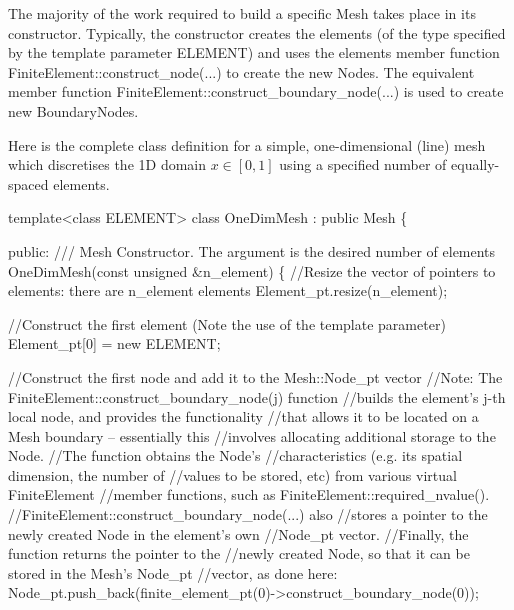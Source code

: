 The majority of the work required to build a specific {\ttfamily Mesh} takes place in its constructor. Typically, the constructor creates the elements (of the type specified by the template parameter {\ttfamily E\+L\+E\+M\+E\+NT}) and uses the elements\textquotesingle{} member function {\ttfamily Finite\+Element\+::construct\+\_\+node}(...) to create the new {\ttfamily Nodes}. The equivalent member function {\ttfamily Finite\+Element\+::construct\+\_\+boundary\+\_\+node}(...) is used to create new {\ttfamily Boundary\+Nodes}.

Here is the complete class definition for a simple, one-\/dimensional (line) mesh which discretises the 1D domain $x\in [0,1]$ using a specified number of equally-\/spaced elements.  
\begin{DoxyCodeInclude}
\textcolor{keyword}{template}<\textcolor{keyword}{class} ELEMENT>
\textcolor{keyword}{class }OneDimMesh : \textcolor{keyword}{public} Mesh
\{

\textcolor{keyword}{public}:
\textcolor{comment}{}
\textcolor{comment}{ /// Mesh Constructor. The argument is the desired number of elements}
\textcolor{comment}{} OneDimMesh(\textcolor{keyword}{const} \textcolor{keywordtype}{unsigned} &n\_element)
 \{
  \textcolor{comment}{//Resize the vector of pointers to elements: there are n\_element elements}
  Element\_pt.resize(n\_element); 

  \textcolor{comment}{//Construct the first element (Note the use of the template parameter)}
  Element\_pt[0] = \textcolor{keyword}{new} ELEMENT;

  \textcolor{comment}{//Construct the first node and add it to the Mesh::Node\_pt vector}
  \textcolor{comment}{//Note: The FiniteElement::construct\_boundary\_node(j) function}
  \textcolor{comment}{//builds the element's j-th local node, and provides the functionality}
  \textcolor{comment}{//that allows it to be located on a Mesh boundary -- essentially this}
  \textcolor{comment}{//involves allocating additional storage to the Node.}
  \textcolor{comment}{//The function obtains the Node's}
  \textcolor{comment}{//characteristics (e.g. its spatial dimension, the number of}
  \textcolor{comment}{//values to be stored, etc) from various virtual FiniteElement}
  \textcolor{comment}{//member functions, such as FiniteElement::required\_nvalue(). }
  \textcolor{comment}{//FiniteElement::construct\_boundary\_node(...) also}
  \textcolor{comment}{//stores a pointer to the newly created Node in the element's own}
  \textcolor{comment}{//Node\_pt vector.}
  \textcolor{comment}{//Finally, the function returns the pointer to the}
  \textcolor{comment}{//newly created Node, so that it can be stored in the Mesh's Node\_pt}
  \textcolor{comment}{//vector, as done here:}
  Node\_pt.push\_back(finite\_element\_pt(0)->construct\_boundary\_node(0));


\end{DoxyCodeInclude}
